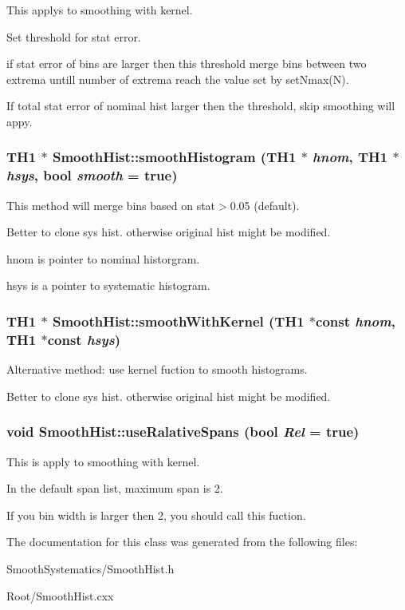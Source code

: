 \label{classSmoothHist_afb5c5cf363ecd6ca1f908f14c2082e1b}
This applys to smoothing with kernel.\par
 Set threshold for stat error.\par
 if stat error of bins are larger then this threshold merge bins between two extrema untill number of extrema reach the value set by setNmax(N).\par
 If total stat error of nominal hist larger then the threshold, skip smoothing will appy. \hypertarget{classSmoothHist_a72c5eb8c25359a8b6bcf9d2e6a03158a}{
\subsubsection[{smoothHistogram}]{\setlength{\rightskip}{0pt plus 5cm}TH1 $\ast$ SmoothHist::smoothHistogram (TH1 $\ast$ {\em hnom}, \/  TH1 $\ast$ {\em hsys}, \/  bool {\em smooth} = {\ttfamily true})}}
\label{classSmoothHist_a72c5eb8c25359a8b6bcf9d2e6a03158a}
This method will merge bins based on stat$>$0.05 (default).\par
 Better to clone sys hist. otherwise original hist might be modified.\par
 hnom is pointer to nominal historgram.\par
 hsys is a pointer to systematic histogram.\par
 \hypertarget{classSmoothHist_af5f8c1ba0805aa4a6ec8ebb85573aa11}{
\subsubsection[{smoothWithKernel}]{\setlength{\rightskip}{0pt plus 5cm}TH1 $\ast$ SmoothHist::smoothWithKernel (TH1 $\ast$const  {\em hnom}, \/  TH1 $\ast$const  {\em hsys})}}
\label{classSmoothHist_af5f8c1ba0805aa4a6ec8ebb85573aa11}
Alternative method: use kernel fuction to smooth histograms.\par
 Better to clone sys hist. otherwise original hist might be modified.\par
 \hypertarget{classSmoothHist_af8d7e0514a1abe58c503548c555134e7}{
\subsubsection[{useRalativeSpans}]{\setlength{\rightskip}{0pt plus 5cm}void SmoothHist::useRalativeSpans (bool {\em Rel} = {\ttfamily true})}}
\label{classSmoothHist_af8d7e0514a1abe58c503548c555134e7}
This is apply to smoothing with kernel.\par
 In the default span list, maximum span is 2.\par
 If you bin width is larger then 2, you should call this fuction.\par
 

The documentation for this class was generated from the following files:\begin{DoxyCompactItemize}
\item 
SmoothSystematics/SmoothHist.h\item 
Root/SmoothHist.cxx\end{DoxyCompactItemize}
